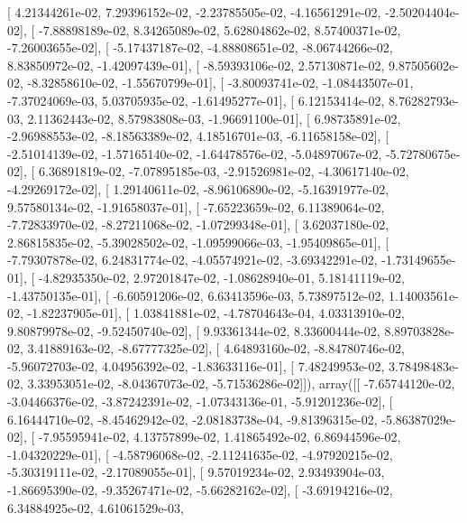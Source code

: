 \documentclass{article}
\begin{document}
       [  4.21344261e-02,   7.29396152e-02,  -2.23785505e-02,
         -4.16561291e-02,  -2.50204404e-02],
       [ -7.88898189e-02,   8.34265089e-02,   5.62804862e-02,
          8.57400371e-02,  -7.26003655e-02],
       [ -5.17437187e-02,  -4.88808651e-02,  -8.06744266e-02,
          8.83850972e-02,  -1.42097439e-01],
       [ -8.59393106e-02,   2.57130871e-02,   9.87505602e-02,
         -8.32858610e-02,  -1.55670799e-01],
       [ -3.80093741e-02,  -1.08443507e-01,  -7.37024069e-03,
          5.03705935e-02,  -1.61495277e-01],
       [  6.12153414e-02,   8.76282793e-03,   2.11362443e-02,
          8.57983808e-03,  -1.96691100e-01],
       [  6.98735891e-02,  -2.96988553e-02,  -8.18563389e-02,
          4.18516701e-03,  -6.11658158e-02],
       [ -2.51014139e-02,  -1.57165140e-02,  -1.64478576e-02,
         -5.04897067e-02,  -5.72780675e-02],
       [  6.36891819e-02,  -7.07895185e-03,  -2.91526981e-02,
         -4.30617140e-02,  -4.29269172e-02],
       [  1.29140611e-02,  -8.96106890e-02,  -5.16391977e-02,
          9.57580134e-02,  -1.91658037e-01],
       [ -7.65223659e-02,   6.11389064e-02,  -7.72833970e-02,
         -8.27211068e-02,  -1.07299348e-01],
       [  3.62037180e-02,   2.86815835e-02,  -5.39028502e-02,
         -1.09599066e-03,  -1.95409865e-01],
       [ -7.79307878e-02,   6.24831774e-02,  -4.05574921e-02,
         -3.69342291e-02,  -1.73149655e-01],
       [ -4.82935350e-02,   2.97201847e-02,  -1.08628940e-01,
          5.18141119e-02,  -1.43750135e-01],
       [ -6.60591206e-02,   6.63413596e-03,   5.73897512e-02,
          1.14003561e-02,  -1.82237905e-01],
       [  1.03841881e-02,  -4.78704643e-04,   4.03313910e-02,
          9.80879978e-02,  -9.52450740e-02],
       [  9.93361344e-02,   8.33600444e-02,   8.89703828e-02,
          3.41889163e-02,  -8.67777325e-02],
       [  4.64893160e-02,  -8.84780746e-02,  -5.96072703e-02,
          4.04956392e-02,  -1.83633116e-01],
       [  7.48249953e-02,   3.78498483e-02,   3.33953051e-02,
         -8.04367073e-02,  -5.71536286e-02]]), array([[ -7.65744120e-02,  -3.04466376e-02,  -3.87242391e-02,
         -1.07343136e-01,  -5.91201236e-02],
       [  6.16444710e-02,  -8.45462942e-02,  -2.08183738e-04,
         -9.81396315e-02,  -5.86387029e-02],
       [ -7.95595941e-02,   4.13757899e-02,   1.41865492e-02,
          6.86944596e-02,  -1.04320229e-01],
       [ -4.58796068e-02,  -2.11241635e-02,  -4.97920215e-02,
         -5.30319111e-02,  -2.17089055e-01],
       [  9.57019234e-02,   2.93493904e-03,  -1.86695390e-02,
         -9.35267471e-02,  -5.66282162e-02],
       [ -3.69194216e-02,   6.34884925e-02,   4.61061529e-03,
\end{document}
